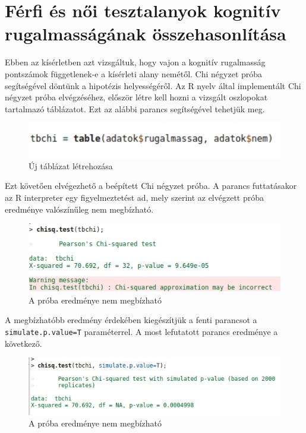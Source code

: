 \documentclass[oneside,titlepage,12pt,a4paper]{report}
\begin{document}
\section*{Férfi és női tesztalanyok kognitív rugalmasságának összehasonlítása}

Ebben az kísérletben azt vizsgáltuk, hogy vajon a kognitív rugalmasság pontszámok függetlenek-e a kísérleti alany nemétől. Chi négyzet próba segítségével döntünk a hipotézis helyességéről. Az R nyelv által implementált Chi négyzet próba elvégzéséhez, először létre kell hozni a vizsgált oszlopokat tartalmazó táblázatot. Ezt az alábbi parancs segítségével tehetjük meg.

\begin{figure}[H]
\begin{center}
  \includegraphics[width=150mm]{./Abrak/chiCreateTable.jpg}
  \caption{Új táblázat létrehozása}
\end{center}
\end{figure}

Ezt követően elvégezhető a beépített Chi négyzet próba. A parancs futtatásakor az R interpreter egy figyelmeztetést ad, mely szerint az elvégzett próba eredménye valószínűleg nem megbízható. 

\begin{figure}[H]
\begin{center}
  \includegraphics[width=150mm]{./Abrak/chiWarn.jpg}
  \caption{A próba eredménye nem megbízható}
\end{center}
\end{figure}

A megbízhatóbb eredmény érdekében kiegészítjük a fenti parancsot a \texttt{simulate.p.value=T} paraméterrel. A most lefutatott parancs eredménye a következő.

\begin{figure}[H]
\begin{center}
  \includegraphics[width=150mm]{./Abrak/chiNoWarn.jpg}
  \caption{A próba eredménye nem megbízható}
\end{center}
\end{figure}
\end{document}
